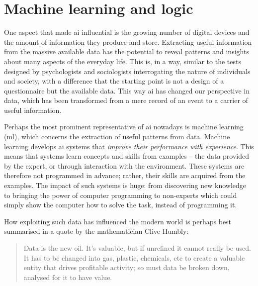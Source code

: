 \section{Machine learning and logic}
\label{sec:intro_ml}


One aspect that made \gls{ai} influential is the growing number of digital devices and the amount of information they produce and store.
Extracting useful information from the massive available data has the potential to reveal patterns and insights about many aspects of the everyday life.
This is, in a way, similar to the tests designed by psychologists and sociologists interrogating the nature of individuals and society, with a difference that the starting point is not a design of a questionnaire but the available data.
This way \gls{ai} has changed our perspective in data, which has been transformed from a mere record of an event to a carrier of useful information.

Perhaps the most prominent representative of \gls{ai} nowadays is machine learning (\gls{ml}), which concerns the extraction of useful patterns from data.
Machine learning develops \gls{ai} systems that \textit{improve their performance with experience}.
This means that systems learn concepts and skills from examples -- the data provided by the expert, or through interaction with the environment.
These systems are therefore not programmed in advance; rather, their skills are acquired from the examples.
The impact of such systems is huge: from discovering new knowledge to bringing the power of computer programming to non-experts which could simply show the computer how to solve the task, instead of programming it.



How exploiting such data has influenced the modern world is perhaps best summarised  in a quote by the mathematician Clive Humbly:
\begin{quote}
	Data is the new oil. It’s valuable, but if unrefined it cannot really be used. It has to be changed into gas, plastic, chemicals, etc to create a valuable entity that drives profitable activity; so must data be broken down, analysed for it to have value.
\end{quote}




